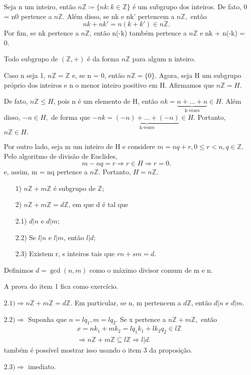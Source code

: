 \documentclass[algebra_notes.tex]{subfiles}
\begin{document}
\begin{example*}
	Seja n um inteiro, então $n\mathbb{Z}\coloneqq \{nk: k\in \mathbb{Z}\}$ é um subgrupo dos inteiros. De fato, 0 = n0 pertence
	a $n\mathbb{Z}.$ Além disso, se nk e nk' pertencem a $n\mathbb{Z},$ então
	$$
		nk + nk' = n(k + k')\in n \mathbb{Z}.
	$$
	Por fim, se nk pertence a $ n\mathbb{Z}$, então n(-k) também pertence a $n \mathbb{Z}$ e nk + n(-k) = 0. \qedsymbol
\end{example*}
\begin{prop*}
	Todo subgrupo de $(\mathbb{Z}, +)$ é da forma $n \mathbb{Z}$ para algum n inteiro.
\end{prop*}
\begin{proof*}
	Caso n seja 1, $n \mathbb{Z} = \mathbb{Z}$ e, se n = 0, então $n \mathbb{Z} = \{0\}. $ Agora, seja H um subgrupo próprio dos
	inteiros e n o menor inteiro positivo em H. Afirmamos que $n \mathbb{Z} = H$.

	De fato, $n \mathbb{Z} \leq{H}$, pois n é um elemento de H, então $nk = \underbrace{n + \ldots + n}_{\text{k-vezes}} \in H$. Além disso, $-n\in H,$ de forma
	que $-nk = \underbrace{(-n) + \ldots + (-n)}_{\text{k-vezes}}\in H.$ Portanto, $n \mathbb{Z}\in H.$

	Por outro lado, seja m um inteiro de H e considere $m = nq + r, 0 \leq{r} < n, q\in \mathbb{Z}.$ Pelo algoritmo de divisão de Euclides,
	$$
		m - nq = r \Rightarrow r\in H\Rightarrow r = 0.
	$$
	e, assim, m = nq pertence a $n\mathbb{Z}$. Portanto, $H = n \mathbb{Z}$. \qedsymbol
\end{proof*}
\begin{prop*}
	\begin{itemize}
		\item[1)] $n \mathbb{Z} + m \mathbb{Z}$ é subgrupo de $\mathbb{Z};$
		\item[2)] $n \mathbb{Z} + m \mathbb{Z} = d \mathbb{Z}$, em que d é tal que
		\item[2.1)] $d | n$ e $d | m$;
		\item[2.2)] Se $l | n$ e $l | m$, então $l | d;$
		\item[2.3)] Existem r, s inteiros tais que $rn + sm = d.$
	\end{itemize}
	Definimos $d = \gcd{(n, m)}$ como o máximo divisor comum de m e n.
\end{prop*}
\begin{proof*}
	A prova do item 1 fica como exercício.

	$2.1)\Rightarrow n \mathbb{Z} + m \mathbb{Z} = d \mathbb{Z}.$ Em particular, se n, m pertencem a $d \mathbb{Z}$, então
	$d | n \text{ e } d | m.$

	$2.2)\Rightarrow$ Suponha que $n = lq_{1}, m = lq_{2} $. Se x pertence a $n \mathbb{Z} + m \mathbb{Z},$ então
	\begin{align*}
		 & x = nk_{1} + mk_{2} = lq_{1}k_{1} + lk_{2}q_{2} \in l \mathbb{Z}                   \\
		 & \Rightarrow n \mathbb{Z} + m \mathbb{Z} \subseteq{l \mathbb{Z}} \Rightarrow l | d.
	\end{align*}
	também é possível mostrar isso usando o item 3 da proposição.

	$2.3)\Rightarrow$ imediato. \qedsymbol
\end{proof*}
\end{document}

